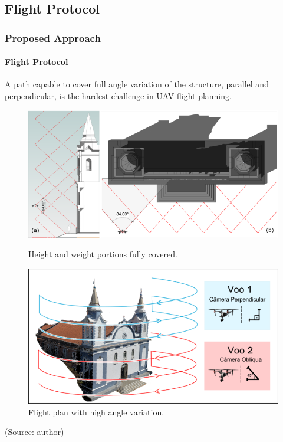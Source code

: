 \documentclass{beamer}
\begin{document}
\subsection{Flight Protocol}
\begin{frame}
  \frametitle{Proposed Approach}
  \framesubtitle{Flight Protocol}
  \justifying
  
  A path capable to cover full angle variation of the structure, parallel and perpendicular, is the hardest challenge in UAV flight planning.
  
  \begin{figure}[ht]
        \begin{minipage}[b]{0.45\linewidth}
            \justifying
            \includegraphics[width=\textwidth]{images/fpa}
            \caption{Height and weight portions fully covered.}
            \label{fig:a}
        \end{minipage}
        \hspace{0.5cm}
        \begin{minipage}[b]{0.45\linewidth}
             \justifying
            \includegraphics[width=\textwidth]{images/fpb}
            \caption{Flight plan with high angle variation.}
            \label{fig:b}
        \end{minipage}
    \end{figure}
    \vspace{-.5cm}
    \centering \small{(Source: author)}
\end{frame}
\end{document}
